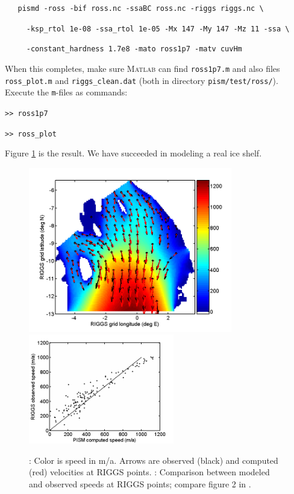 \documentclass[11pt,final]{amsart}
\newcommand{\Matlab}{\textsc{Matlab}\xspace}
\begin{document}
\verb|   pismd -ross -bif ross.nc -ssaBC ross.nc -riggs riggs.nc \|

\verb|     -ksp_rtol 1e-08 -ssa_rtol 1e-05 -Mx 147 -My 147 -Mz 11 -ssa \|

\verb|     -constant_hardness 1.7e8 -mato ross1p7 -matv cuvHm|

\noindent When this completes, make sure \Matlab can find \verb|ross1p7.m| and also files \verb|ross_plot.m| and \verb|riggs_clean.dat| (both in directory \verb|pism/test/ross/|).  Execute the \verb|m|-files as commands:

\verb|>> ross1p7|

\verb|>> ross_plot|

\noindent Figure \ref{fig:rossmatlab} is the result.  We have succeeded in modeling a real ice shelf.

\begin{figure}[ht]
\includegraphics[width=3.5in,keepaspectratio=true]{figs/rossquiver}\quad \includegraphics[width=2.5in,keepaspectratio=true]{figs/rossscatter}
\caption{: Color is speed in m/a.  Arrows are observed (black) and computed (red) velocities at RIGGS points.  : Comparison between modeled and observed speeds at RIGGS points; compare figure 2  in \cite{MacAyealetal}.}
\label{fig:rossmatlab}
\end{figure}
\end{document}
